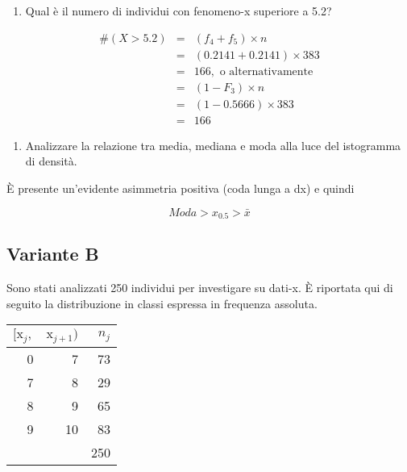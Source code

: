 \documentclass[
  11pt,
]{book}
\providecommand{\tightlist}{%
  \setlength{\itemsep}{0pt}\setlength{\parskip}{0pt}}
\theoremstyle{mytheoremstyle}
\theoremstyle{mydefstyle}
\newenvironment{sol}
  {
  \begin{tcolorbox}[enhanced,breakable,arc=0.1mm,boxrule=1pt,colback=white,colframe=iblue,
  title=\bf \fontfamily{lmss}\selectfont \hspace{.5 cm} Soluzione,drop fuzzy shadow]

}{
\end{tcolorbox}
  }
\begin{document}
\begin{enumerate}
\def\labelenumi{\alph{enumi}.}
\setcounter{enumi}{2}
\tightlist
\item
  Qual è il numero di individui con fenomeno-x superiore a 5.2?
\end{enumerate}

\begin{sol}
\begin{eqnarray*}
  \#(X>5.2) &=&  (f_4+f_5)\times n\\
            &=& (0.2141+0.2141)\times 383\\
            &=& 166,\text{ o alternativamente}\\
            &=& (1-F_3)\times n\\
            &=& (1-0.5666)\times 383\\
            &=& 166
\end{eqnarray*}

\end{sol}

\begin{enumerate}
\def\labelenumi{\alph{enumi}.}
\setcounter{enumi}{3}
\tightlist
\item
  Analizzare la relazione tra media, mediana e moda alla luce del istogramma di densità.
\end{enumerate}

\begin{sol}
È presente un'evidente asimmetria positiva (coda lunga a dx) e quindi

\[Moda>x_{0.5}>\bar x\]

\end{sol}

\subsection{Variante B}\label{variante-b}

Sono stati analizzati 250 individui per investigare su dati-x. È riportata qui di seguito la distribuzione in classi espressa in frequenza assoluta.

\begin{table}[H]
\centering
\begin{tabular}{rrr}
\toprule
$[\text{x}_j,$ & $\text{x}_{j+1})$ & $n_j$\\
\midrule
0 & 7 & 73\\
7 & 8 & 29\\
8 & 9 & 65\\
9 & 10 & 83\\
 &  & 250\\
\bottomrule
\end{tabular}
\end{table}
\end{document}
